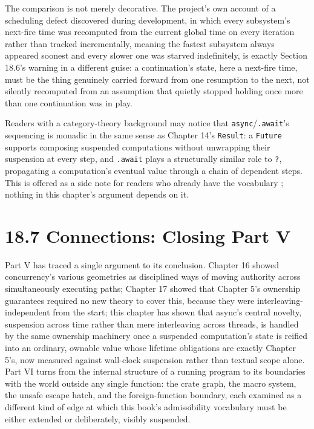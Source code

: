 \documentclass[11pt]{book}
\begin{document}
The comparison is not merely decorative. The project's own account of a scheduling defect discovered during development, in which every subsystem's next-fire time was recomputed from the current global time on every iteration rather than tracked incrementally, meaning the fastest subsystem always appeared soonest and every slower one was starved indefinitely, is exactly Section 18.6's warning in a different guise: a continuation's state, here a next-fire time, must be the thing genuinely carried forward from one resumption to the next, not silently recomputed from an assumption that quietly stopped holding once more than one continuation was in play.

\begin{categorybox}
Readers with a category-theory background may notice that \texttt{async}/\texttt{.await}'s sequencing is monadic in the same sense as Chapter 14's \texttt{Result}: a \texttt{Future} supports composing suspended computations without unwrapping their suspension at every step, and \texttt{.await} plays a structurally similar role to \texttt{?}, propagating a computation's eventual value through a chain of dependent steps. This is offered as a side note for readers who already have the vocabulary \cite{milewski2019}; nothing in this chapter's argument depends on it.
\end{categorybox}

\section*{18.7 Connections: Closing Part V}

Part V has traced a single argument to its conclusion. Chapter 16 showed concurrency's various geometries as disciplined ways of moving authority across simultaneously executing paths; Chapter 17 showed that Chapter 5's ownership guarantees required no new theory to cover this, because they were interleaving-independent from the start; this chapter has shown that async's central novelty, suspension across time rather than mere interleaving across threads, is handled by the same ownership machinery once a suspended computation's state is reified into an ordinary, ownable value whose lifetime obligations are exactly Chapter 5's, now measured against wall-clock suspension rather than textual scope alone. Part VI turns from the internal structure of a running program to its boundaries with the world outside any single function: the crate graph, the macro system, the unsafe escape hatch, and the foreign-function boundary, each examined as a different kind of edge at which this book's admissibility vocabulary must be either extended or deliberately, visibly suspended.
\end{document}
